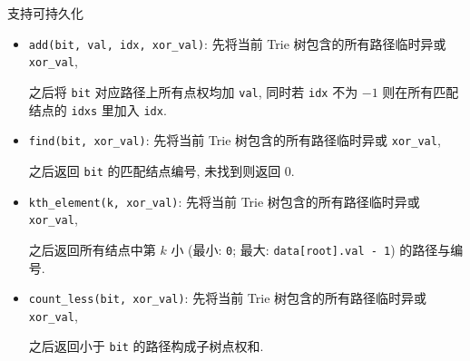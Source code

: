 支持可持久化

\begin{itemize}
    \item \verb|add(bit, val, idx, xor_val)|: 先将当前 Trie 树包含的所有路径临时异或 \verb|xor_val|,

          之后将 \verb|bit| 对应路径上所有点权均加 \verb|val|, 同时若 \verb|idx| 不为 \(-1\) 则在所有匹配结点的 \verb|idxs| 里加入 \verb|idx|.

    \item \verb|find(bit, xor_val)|: 先将当前 Trie 树包含的所有路径临时异或 \verb|xor_val|,

          之后返回 \verb|bit| 的匹配结点编号, 未找到则返回 \(0\).

    \item \verb|kth_element(k, xor_val)|: 先将当前 Trie 树包含的所有路径临时异或 \verb|xor_val|,

          之后返回所有结点中第 \(k\) 小 (最小: \verb|0|; 最大: \verb|data[root].val - 1|) 的路径与编号.

    \item \verb|count_less(bit, xor_val)|: 先将当前 Trie 树包含的所有路径临时异或 \verb|xor_val|,

          之后返回小于 \verb|bit| 的路径构成子树点权和.
\end{itemize}
